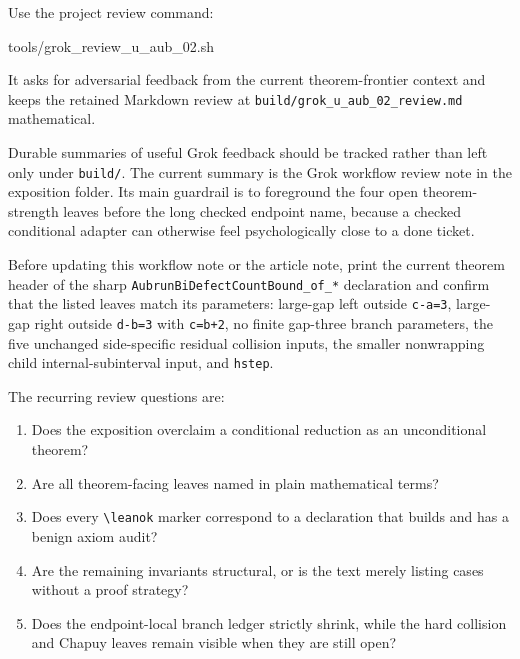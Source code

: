 \documentclass[
]{article}
\newenvironment{Shaded}{}{}
\newcommand{\NormalTok}[1]{#1}
\providecommand{\tightlist}{%
  \setlength{\itemsep}{0pt}\setlength{\parskip}{0pt}}
\begin{document}
Use the project review command:

\begin{Shaded}
\begin{Highlighting}[]
\NormalTok{tools/grok\_review\_u\_aub\_02.sh}
\end{Highlighting}
\end{Shaded}

It asks for adversarial feedback from the current theorem-frontier
context and keeps the retained Markdown review at
\texttt{build/grok\_u\_aub\_02\_review.md} mathematical.

Durable summaries of useful Grok feedback should be tracked rather than
left only under \texttt{build/}. The current summary is the Grok
workflow review note in the exposition folder. Its main guardrail is to
foreground the four open theorem-strength leaves before the long checked
endpoint name, because a checked conditional adapter can otherwise feel
psychologically close to a done ticket.

Before updating this workflow note or the article note, print the
current theorem header of the sharp
\texttt{AubrunBiDefectCountBound\_of\_*} declaration and confirm that
the listed leaves match its parameters: large-gap left outside
\texttt{c-a=3}, large-gap right outside \texttt{d-b=3} with
\texttt{c=b+2}, no finite gap-three branch parameters, the five
unchanged side-specific residual collision inputs, the smaller
nonwrapping child internal-subinterval input, and \texttt{hstep}.

The recurring review questions are:

\begin{enumerate}
\def\labelenumi{\arabic{enumi}.}
\tightlist
\item
  Does the exposition overclaim a conditional reduction as an
  unconditional theorem?
\item
  Are all theorem-facing leaves named in plain mathematical terms?
\item
  Does every \texttt{\textbackslash{}leanok} marker correspond to a
  declaration that builds and has a benign axiom audit?
\item
  Are the remaining invariants structural, or is the text merely listing
  cases without a proof strategy?
\item
  Does the endpoint-local branch ledger strictly shrink, while the hard
  collision and Chapuy leaves remain visible when they are still open?
\end{enumerate}
\end{document}
